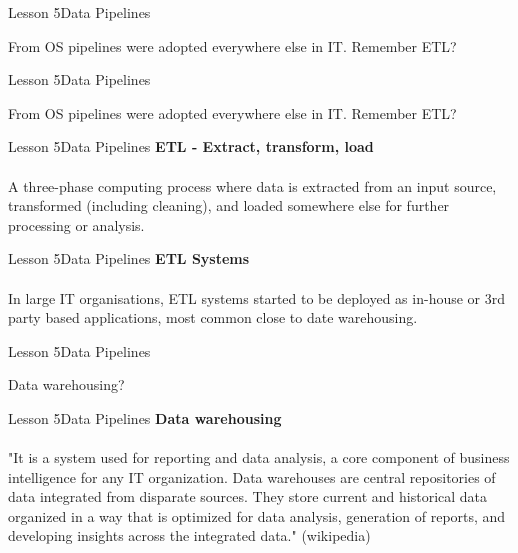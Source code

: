 \documentclass[aspectratio=1610]{beamer}
\begin{document}
\begin{frame}{Lesson 5}{Data Pipelines}
\Huge
\begin{center}
From OS pipelines were adopted everywhere else in IT. Remember ETL?
\end{center}
\end{frame}



\begin{frame}{Lesson 5}{Data Pipelines}
\Huge
\begin{center}
From OS pipelines were adopted everywhere else in IT. Remember \alert{ETL}?
\end{center}
\end{frame}



\begin{frame}{Lesson 5}{Data Pipelines}
\LARGE
\textbf{ETL - Extract, transform, load}\\~\\
A three-phase computing process where data is extracted from an input source, 
transformed (including cleaning), and loaded somewhere else for further 
processing or analysis.
\end{frame}


\begin{frame}{Lesson 5}{Data Pipelines}
\LARGE
\textbf{ETL Systems}\\~\\
In large IT organisations, \alert{ETL systems} started to be deployed as 
in-house or 3rd party based applications, most common close to \alert{date 
warehousing}. 
\end{frame}



\begin{frame}{Lesson 5}{Data Pipelines}
\Huge
\begin{center}
Data warehousing?
\end{center}
\end{frame}


\begin{frame}{Lesson 5}{Data Pipelines}
\LARGE
\textbf{Data warehousing}\\~\\
"It is a system used for reporting and data analysis, a core component of 
business intelligence for any IT organization. Data warehouses are central 
repositories of data integrated from disparate sources. They store current and 
historical data organized in a way that is optimized for data analysis, 
generation of reports, and developing insights across the integrated data."
(wikipedia)
\end{frame}
\end{document}
